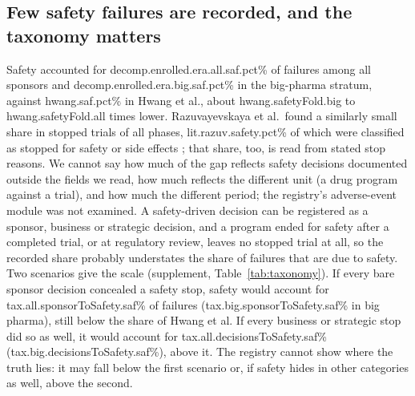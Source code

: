 \documentclass[11pt]{article}
\begin{document}
\subsection{Few safety failures are recorded, and the taxonomy matters}\label{sec:safety}
Safety accounted for \num{decomp.enrolled.era.all.saf.pct}\% of failures among all sponsors and \num{decomp.enrolled.era.big.saf.pct}\% in the big-pharma stratum, against \num{hwang.saf.pct}\% in Hwang et al., about \num{hwang.safetyFold.big} to \num{hwang.safetyFold.all} times lower. Razuvayevskaya et al.\ found a similarly small share in stopped trials of all phases, \num{lit.razuv.safety.pct}\% of which were classified as stopped for safety or side effects \cite{razuv2024}; that share, too, is read from stated stop reasons. We cannot say how much of the gap reflects safety decisions documented outside the fields we read, how much reflects the different unit (a drug program against a trial), and how much the different period; the registry's adverse-event module was not examined. A safety-driven decision can be registered as a sponsor, business or strategic decision, and a program ended for safety after a completed trial, or at regulatory review, leaves no stopped trial at all, so the recorded share probably understates the share of failures that are due to safety. Two scenarios give the scale (supplement, Table~\ref{tab:taxonomy}). If every bare sponsor decision concealed a safety stop, safety would account for \num{tax.all.sponsorToSafety.saf}\% of failures (\num{tax.big.sponsorToSafety.saf}\% in big pharma), still below the share of Hwang et al. If every business or strategic stop did so as well, it would account for \num{tax.all.decisionsToSafety.saf}\% (\num{tax.big.decisionsToSafety.saf}\%), above it. The registry cannot show where the truth lies: it may fall below the first scenario or, if safety hides in other categories as well, above the second.
\end{document}
